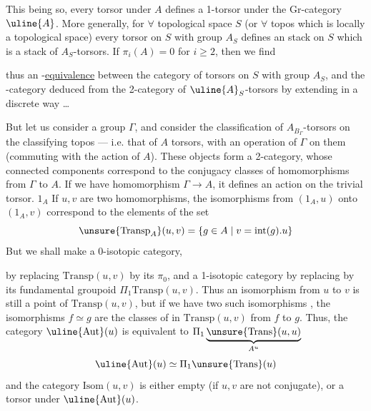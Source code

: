 This being so, every torsor under \(A\) defines a 1-torsor under the Gr-category \(\uline{A}\). More generally, for \(\forall\) topological space \(S\) (or \(\forall\) topos which is locally a topological space) every torsor on \(S\) with group \(A_S\) defines an stack on \(S\) which is a  stack of \(A_S\)-torsors. If \(\pi_i(A)=0\) for \(i\geq2\), then we find



thus  an -\uline{equivalence} between the category of torsors on \(S\) with group \(A_S\), and the -category deduced from the 2-category of  \(\uline{A}_S\)-torsors by extending  in a discrete way \ldots

But let us consider  a group \(\Gamma\), and consider the classification of \(A_{B_\Gamma}\)-torsors on the classifying topos --- i.e. that of \(A\) torsors, with an operation of \(\Gamma\) on them (commuting with the action of \(A\)). These objects form a 2-category, whose connected components correspond to the conjugacy classes of homomorphisms from \(\Gamma\) to \(A\). If we have   homomorphism \(\Gamma\to A\), it defines  an action on the trivial torsor. \(1_A\) If \(u,v\) are two homomorphisms, the isomorphisms from \((1_A,u)\) onto \((1_A,v)\) correspond to the elements of the set 
\[
\unsure{\mathrm{Transp}_A}(u,v)=\{g\in A\mid v=\mathrm{int}(g).u\}
\]
But we shall make a 0-isotopic category,



by replacing \(\mathrm{Transp}(u,v)\) by its \(\pi_0\), and a 1-isotopic category by replacing  by its fundamental groupoid \(\Pi_1\mathrm{Transp}(u,v)\). Thus an isomorphism from \(u\) to \(v\) is still a point of \(\mathrm{Transp}(u,v)\), but if we have two such isomorphisms , the isomorphisms \(f\simeq g\) are the classes of  in \(\mathrm{Transp}(u,v)\) from \(f\) to \(g\). Thus, the category \(\uline{\mathrm{Aut}}(u)\) is equivalent to \(\Pi_1\underbrace{\unsure{\mathrm{Trans}}(u,u)}_{A^u}\) 
\[
\uline{\mathrm{Aut}}(u)\simeq\Pi_1\unsure{\mathrm{Trans}}(u)
\]
and the  category \(\mathrm{Isom}(u,v)\) is either empty (if \(u,v\) are not conjugate), or a torsor under \(\uline{\mathrm{Aut}}(u)\).

